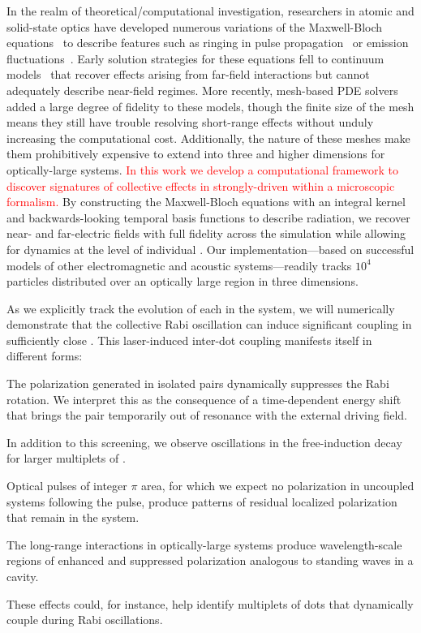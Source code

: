 In the realm of theoretical/computational investigation, researchers in atomic and solid-state optics have developed numerous variations of the Maxwell-Bloch equations~\cite{Gross1982} to describe features such as ringing in pulse propagation~\cite{Burnham1969,MacGillivray1976} or emission fluctuations~\cite{Haake1979}.
Early solution strategies for these equations fell to continuum models~\cite{Rehler1971,MacGillivray1976} that recover effects arising from far-field interactions but cannot adequately describe near-field regimes.
More recently, mesh-based PDE solvers~\cite{Vanneste2001,Fratalocchi2008,Bachelard2015} added a large degree of fidelity to these models, though the finite size of the mesh means they still have trouble resolving short-range effects without unduly increasing the computational cost.
Additionally, the nature of these meshes make them prohibitively expensive to extend into three and higher dimensions for optically-large systems.
\textcolor{red}{In this work we develop a computational framework to discover signatures of collective effects in strongly-driven \qds{} within a microscopic formalism.}
By constructing the Maxwell-Bloch equations with an integral kernel and backwards-looking temporal basis functions to describe radiation, we recover near- and far-electric fields with full fidelity across the simulation while allowing for dynamics at the level of individual \qds{}. 
Our implementation---based on successful models of other electromagnetic \cite{otherpapersfromshanker} and acoustic \cite{Glosser2016} systems---readily tracks $10^4$ particles distributed over an optically large region in three dimensions.

As we explicitly track the evolution of each \qd{} in the system, we will numerically demonstrate that the collective Rabi oscillation can induce significant coupling in sufficiently close \qds{}.
This laser-induced inter-dot coupling manifests itself in different forms:
\begin{inparaenum}[(i)]
  \item The polarization generated in isolated \qd{} pairs dynamically suppresses the Rabi rotation.
    We interpret this as the consequence of a time-dependent energy shift that brings the pair temporarily out of resonance with the external driving field.
  \item In addition to this screening, we observe oscillations in the free-induction decay for larger multiplets of \qds{}.
  \item Optical pulses of integer $\pi$ area, for which we expect no polarization in uncoupled systems following the pulse, produce patterns of residual localized polarization that remain in the system.
  \item The long-range interactions in optically-large systems produce wavelength-scale regions of enhanced and suppressed polarization analogous to standing waves in a cavity.
\end{inparaenum}
These effects could, for instance, help identify multiplets of dots that dynamically couple during Rabi oscillations.

